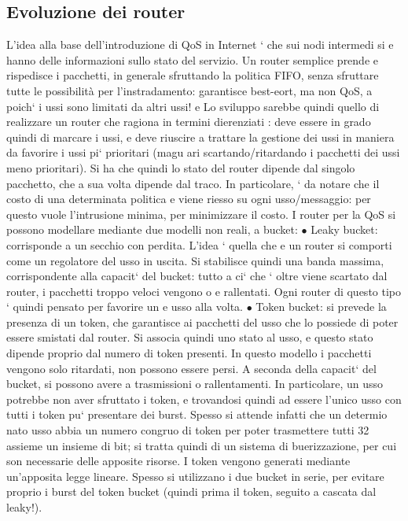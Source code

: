 \documentclass[a4paper,12pt]{article}
\begin{document}
\subsection{Evoluzione dei router}
L'idea alla base dell'introduzione di QoS in Internet ` che sui nodi intermedi si
e
hanno delle informazioni sullo stato del servizio. Un router semplice prende e
rispedisce i pacchetti, in generale sfruttando la politica FIFO, senza sfruttare
tutte le possibilità per l'instradamento: garantisce best-eort, ma non QoS,
a
poich` i ussi sono limitati da altri ussi!
e
Lo sviluppo sarebbe quindi quello di realizzare un router che ragiona in termini dierenziati : deve essere in grado
quindi di marcare i ussi, e deve riuscire
a trattare la gestione dei ussi in maniera da favorire i ussi pi` prioritari (magu
ari scartando/ritardando i pacchetti dei ussi meno prioritari). Si ha che quindi
lo stato del router dipende dal singolo pacchetto, che a sua volta dipende dal
traco. In particolare, ` da notare che il costo di una determinata politica
e
viene riesso su ogni usso/messaggio: per questo vuole l'intrusione minima,
per minimizzare il costo.
I router per la QoS si possono modellare mediante due modelli non reali, a
bucket:
$\bullet$ Leaky bucket: corrisponde a un secchio con perdita. L'idea ` quella che
e
un router si comporti come un regolatore del usso in uscita. Si stabilisce
quindi una banda massima, corrispondente alla capacit` del bucket: tutto
a
ci` che ` oltre viene scartato dal router, i pacchetti troppo veloci vengono
o
e
rallentati. Ogni router di questo tipo ` quindi pensato per favorire un
e
usso alla volta.
$\bullet$ Token bucket: si prevede la presenza di un token, che garantisce ai pacchetti del usso che lo possiede di
poter essere smistati dal router. Si associa
quindi uno stato al usso, e questo stato dipende proprio dal numero di
token presenti. In questo modello i pacchetti vengono solo ritardati, non
possono essere persi. A seconda della capacit` del bucket, si possono avere
a
trasmissioni o rallentamenti. In particolare, un usso potrebbe non aver
sfruttato i token, e trovandosi quindi ad essere l'unico usso con tutti i
token pu` presentare dei burst. Spesso si attende infatti che un determio
nato usso abbia un numero congruo di token per poter trasmettere tutti
32
assieme un insieme di bit; si tratta quindi di un sistema di buerizzazione,
per cui son necessarie delle apposite risorse. I token vengono generati
mediante un'apposita legge lineare.
Spesso si utilizzano i due bucket in serie, per evitare proprio i burst del token
bucket (quindi prima il token, seguito a cascata dal leaky!).
\end{document}
